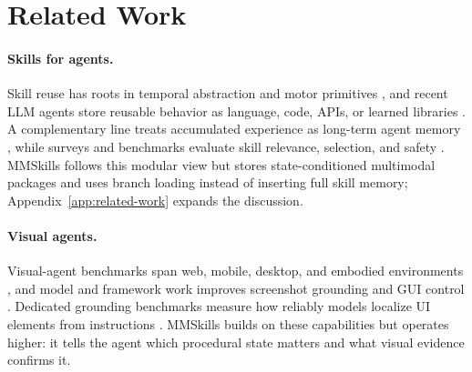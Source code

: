 \documentclass{llmxive}
\begin{document}

\section{Related Work}
\label{sec:related-work}

\paragraph{Skills for agents.}
Skill reuse has roots in temporal abstraction and motor primitives \citep{sutton1999options,ijspeert2013dmp}, and recent LLM agents store reusable behavior as language, code, APIs, or learned libraries \citep{ichter2022saycan,liang2023codepolicies,yao2023react,shinn2023reflexion,wang2023voyager,zheng2025skillweaver,chen2026cuaskill,wang2026skillx,alzubi2026evoskill,ma2026skillclawletskillsevolve,xia2026skillrlevolvingagentsrecursive}. A complementary line treats accumulated experience as long-term agent memory \citep{park2023generativeagentsinteractivesimulacra,packer2024memgptllmsoperatingsystems}, while surveys and benchmarks evaluate skill relevance, selection, and safety \citep{xu2026agentskills,li2026skillsbenchbenchmarkingagentskills,wang2026skilltesterbenchmarkingutilitysecurity,liu2026agenticskillsworkwild}. MMSkills follows this modular view but stores state-conditioned multimodal packages and uses branch loading instead of inserting full skill memory; Appendix~\ref{app:related-work} expands the discussion.

\paragraph{Visual agents.}
Visual-agent benchmarks span web, mobile, desktop, and embodied environments \citep{deng2023mind2web,zhou2024webarena,koh2024visualwebarena,he2024webvoyager,rawles2025androidworld,xie2024osworld,yang2025macosworld,liu2024visualagentbench}, and model and framework work improves screenshot grounding and GUI control \citep{cheng2024seeclick,wu2024osatlas,qin2025uitars,agashe2024agents,hong2024cogagentvisuallanguagemodel,zheng2024gpt4visiongeneralistwebagent,zhang2023appagentmultimodalagentssmartphone,lu2024omniparserpurevisionbased}. Dedicated grounding benchmarks measure how reliably models localize UI elements from instructions \citep{li2025screenspotproguigroundingprofessional,gou2025navigatingdigitalworldhumans,wang2025mmbenchguihierarchicalmultiplatformevaluation,xu2025deskvisionlargescaledesktop}. MMSkills builds on these capabilities but operates higher: it tells the agent which procedural state matters and what visual evidence confirms it.
\end{document}
